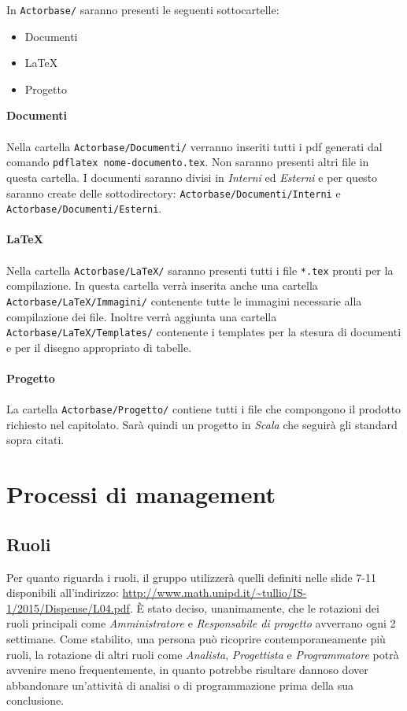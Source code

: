 \documentclass[a4paper]{report}
\begin{document}
	In \verb|Actorbase/| saranno presenti le seguenti sottocartelle:
	\begin{itemize}
		\item Documenti
		\item LaTeX
		\item Progetto
	\end{itemize}
	\textbf{Documenti} \\ \\
	Nella cartella \verb|Actorbase/Documenti/| verranno inseriti tutti i pdf generati dal comando \verb|pdflatex nome-documento.tex|. Non 
	saranno presenti altri file in questa cartella. I documenti saranno divisi in \emph{Interni} ed \emph{Esterni} e per questo saranno create
	delle sottodirectory: \verb|Actorbase/Documenti/Interni| e\\  \verb|Actorbase/Documenti/Esterni|. \\ \\
	\textbf{LaTeX} \\ \\
	Nella cartella \verb|Actorbase/LaTeX/| saranno presenti tutti i file \verb|*.tex| pronti per la compilazione. In questa cartella verrà inserita
	anche una cartella\\ \verb|Actorbase/LaTeX/Immagini/| contenente tutte le immagini necessarie alla compilazione dei file.
	Inoltre verrà aggiunta una cartella \verb|Actorbase/LaTeX/Templates/| contenente i templates per la stesura di documenti e per il
	disegno appropriato di tabelle. \\ \\
	\textbf{Progetto} \\ \\
	La cartella \verb|Actorbase/Progetto/| contiene tutti i file che compongono il prodotto richiesto nel capitolato. Sarà quindi un progetto in
	\emph{Scala} che seguirà gli standard sopra citati.
	\section{Processi di management}
	\subsection{Ruoli}
	Per quanto riguarda i ruoli, il gruppo utilizzerà quelli definiti nelle slide 7-11 disponibili all'indirizzo: 
	\url{http://www.math.unipd.it/~tullio/IS-1/2015/Dispense/L04.pdf}. È stato deciso, unanimamente, che le rotazioni dei ruoli principali
	come \emph{Amministratore} e \emph{Responsabile di progetto} avverrano ogni 2 settimane. Come stabilito, una persona può ricoprire
	contemporaneamente più ruoli, la rotazione di altri ruoli come \emph{Analista}, \emph{Progettista} e \emph{Programmatore} potrà avvenire 
	meno frequentemente, in quanto potrebbe risultare dannoso dover abbandonare un'attività di analisi o di programmazione prima della sua 
	conclusione. 
	
\end{document}
